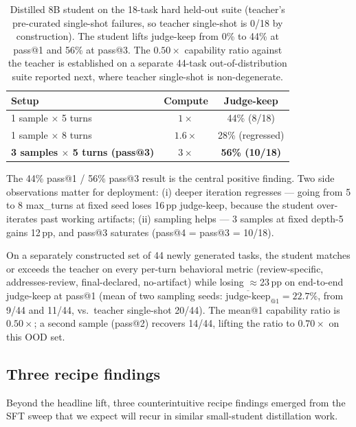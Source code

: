 \documentclass[11pt]{article}
\begin{document}
\begin{table}[ht]
\centering
\caption{Distilled 8B student on the 18-task hard held-out suite (teacher's pre-curated single-shot failures, so teacher single-shot is 0/18 by construction). The student lifts judge-keep from 0\% to 44\% at pass@1 and 56\% at pass@3. The $0.50\times$ capability ratio against the teacher is established on a separate 44-task out-of-distribution suite reported next, where teacher single-shot is non-degenerate.}
\label{tab:distill-headline}
\small
\begin{tabular}{lcc}
\toprule
Setup & Compute & Judge-keep \\
\midrule
1 sample $\times$ 5 turns                                  & $1\times$ & 44\% (8/18) \\
1 sample $\times$ 8 turns                                  & $1.6\times$ & 28\% (regressed) \\
\textbf{3 samples $\times$ 5 turns (pass@3)}               & $3\times$ & \textbf{56\% (10/18)} \\
\bottomrule
\end{tabular}
\end{table}

The 44\% pass@1 / 56\% pass@3 result is the central positive finding. Two side observations matter for deployment: (i) deeper iteration regresses --- going from 5 to 8 max\_turns at fixed seed loses 16\,pp judge-keep, because the student over-iterates past working artifacts; (ii) sampling helps --- 3 samples at fixed depth-5 gains 12\,pp, and pass@3 saturates (pass@4 = pass@3 = 10/18).

On a separately constructed set of 44 newly generated tasks, the student matches or exceeds the teacher on every per-turn behavioral metric (review-specific, addresses-review, final-declared, no-artifact) while losing $\approx$23\,pp on end-to-end judge-keep at pass@1 (mean of two sampling seeds: $\overline{\text{judge-keep}}_{@1} = 22.7\%$, from 9/44 and 11/44, vs.\ teacher single-shot 20/44). The mean@1 capability ratio is $0.50\times$; a second sample (pass@2) recovers 14/44, lifting the ratio to $0.70\times$ on this OOD set.

\subsection{Three recipe findings}
\label{sec:distill-recipes}

Beyond the headline lift, three counterintuitive recipe findings emerged from the SFT sweep that we expect will recur in similar small-student distillation work.
\end{document}

